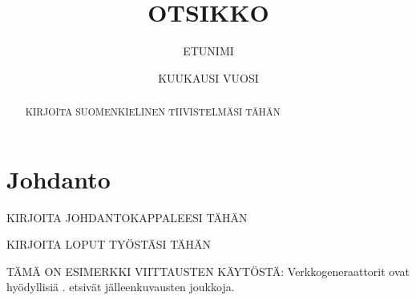 \documentclass[mscthesis,finnish,oneside]{uefcsthesis}
\title{OTSIKKO} %
\author{ETUNIMI}{SUKUNIMI} %
\date{KUUKAUSI VUOSI} %
\begin{document}
\maketitle
\begin{abstract}
  KIRJOITA SUOMENKIELINEN TIIVISTELMÄSI TÄHÄN
\end{abstract}

\frontmatter
\tableofcontents
\mainmatter

\chapter{Johdanto}
\label{cha:johdanto}

KIRJOITA JOHDANTOKAPPALEESI TÄHÄN

KIRJOITA LOPUT TYÖSTÄSI TÄHÄN

TÄMÄ ON ESIMERKKI VIITTAUSTEN KÄYTÖSTÄ:
Verkkogeneraattorit ovat hyödyllisiä \citep{metzler18random}.
\citet{kalofolias18from} etsivät jälleenkuvausten joukkoja.



\backmatter %
\end{document}
